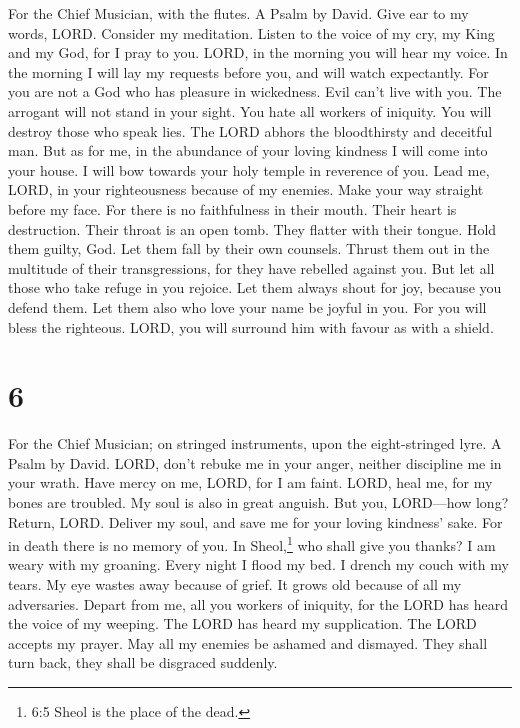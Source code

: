 For the Chief Musician, with the flutes. A Psalm by David. 
Give ear to my words, LORD. Consider my meditation.  Listen
to the voice of my cry, my King and my God, for I pray to you.
 LORD, in the morning you will hear my voice. In the morning
I will lay my requests before you, and will watch expectantly.
 For you are not a God who has pleasure in wickedness. Evil
can't live with you.  The arrogant will not stand in your
sight. You hate all workers of iniquity.  You will destroy
those who speak lies. The LORD abhors the bloodthirsty and deceitful
man.  But as for me, in the abundance of your loving
kindness I will come into your house. I will bow towards your holy
temple in reverence of you.  Lead me, LORD, in your
righteousness because of my enemies. Make your way straight before my
face.  For there is no faithfulness in their mouth. Their
heart is destruction. Their throat is an open tomb. They flatter with
their tongue.  Hold them guilty, God. Let them fall by
their own counsels. Thrust them out in the multitude of their
transgressions, for they have rebelled against you.  But
let all those who take refuge in you rejoice. Let them always shout for
joy, because you defend them. Let them also who love your name be joyful
in you.  For you will bless the righteous. LORD, you will
surround him with favour as with a shield.

\hypertarget{section-5}{%
\section{6}\label{section-5}}

For the Chief Musician; on stringed instruments, upon the eight-stringed
lyre. A Psalm by David.  LORD, don't rebuke me in your
anger, neither discipline me in your wrath.  Have mercy on
me, LORD, for I am faint. LORD, heal me, for my bones are troubled.
 My soul is also in great anguish. But you, LORD---how long?
 Return, LORD. Deliver my soul, and save me for your loving
kindness' sake.  For in death there is no memory of you. In
Sheol,\footnote{6:5 Sheol is the place of the dead.} who shall give you
thanks?  I am weary with my groaning. Every night I flood my
bed. I drench my couch with my tears.  My eye wastes away
because of grief. It grows old because of all my adversaries.
 Depart from me, all you workers of iniquity, for the LORD
has heard the voice of my weeping.  The LORD has heard my
supplication. The LORD accepts my prayer.  May all my
enemies be ashamed and dismayed. They shall turn back, they shall be
disgraced suddenly.

